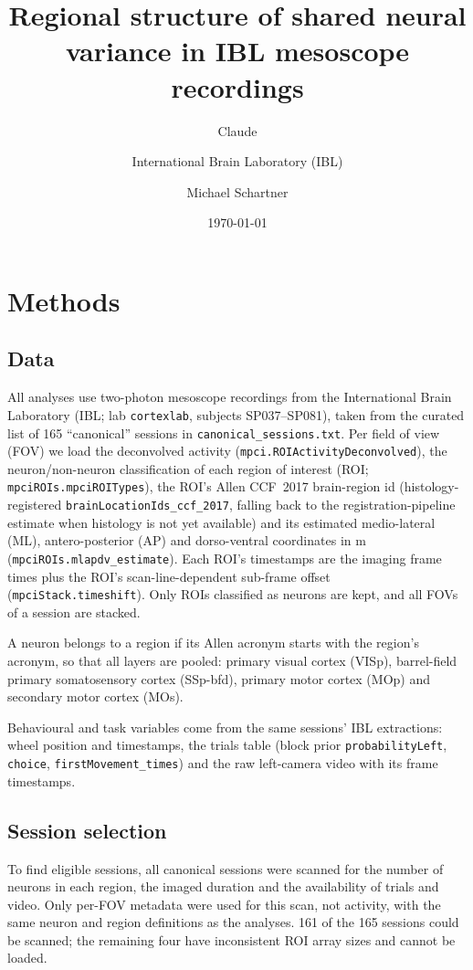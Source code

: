 \documentclass[11pt]{article}
\title{Regional structure of shared neural variance in IBL mesoscope recordings}
\author{Claude \and International Brain Laboratory (IBL) \and Michael Schartner}
\date{\today}
\begin{document}
\maketitle

\section{Methods}

\subsection{Data}

All analyses use two-photon mesoscope recordings from the International Brain Laboratory (IBL; lab \texttt{cortexlab}, subjects SP037--SP081), taken from the curated list of 165 ``canonical'' sessions in \texttt{canonical\_sessions.txt}. Per field of view (FOV) we load the deconvolved activity (\texttt{mpci.ROIActivityDeconvolved}), the neuron/non-neuron classification of each region of interest (ROI; \texttt{mpciROIs.mpciROITypes}), the ROI's Allen CCF~2017 brain-region id (histology-registered \texttt{brainLocationIds\_ccf\_2017}, falling back to the registration-pipeline estimate when histology is not yet available) and its estimated medio-lateral (ML), antero-posterior (AP) and dorso-ventral coordinates in \textmu m (\texttt{mpciROIs.mlapdv\_estimate}). Each ROI's timestamps are the imaging frame times plus the ROI's scan-line-dependent sub-frame offset (\texttt{mpciStack.timeshift}). Only ROIs classified as neurons are kept, and all FOVs of a session are stacked.

A neuron belongs to a region if its Allen acronym starts with the region's acronym, so that all layers are pooled: primary visual cortex (VISp), barrel-field primary somatosensory cortex (SSp-bfd), primary motor cortex (MOp) and secondary motor cortex (MOs).

Behavioural and task variables come from the same sessions' IBL extractions: wheel position and timestamps, the trials table (block prior \texttt{probabilityLeft}, \texttt{choice}, \texttt{firstMovement\_times}) and the raw left-camera video with its frame timestamps.

\subsection{Session selection}

To find eligible sessions, all canonical sessions were scanned for the number of neurons in each region, the imaged duration and the availability of trials and video. Only per-FOV metadata were used for this scan, not activity, with the same neuron and region definitions as the analyses. 161 of the 165 sessions could be scanned; the remaining four have inconsistent ROI array sizes and cannot be loaded.
\end{document}
